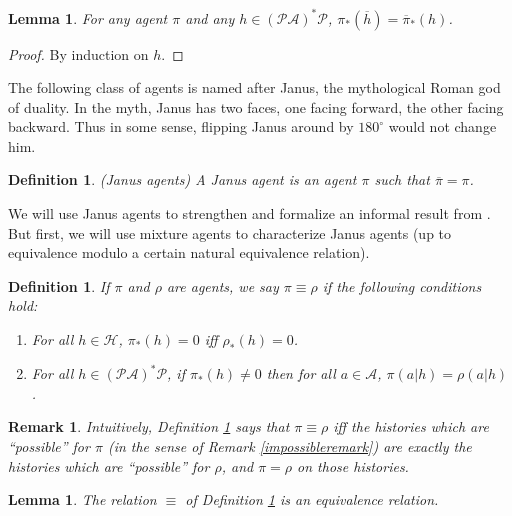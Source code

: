 \documentclass{article}
\newtheorem{definition}[theorem]{Definition}
\newtheorem{remark}[theorem]{Remark}
\newtheorem{lemma}[theorem]{Lemma}
\begin{document}
\begin{lemma}
\label{asteriskcommuteswithoverlinelemma}
    For any agent $\pi$ and any $h\in(\mathcal P\mathcal A)^*\mathcal P$,
    $\pi_*(\overline h)=\overline{\pi}_*(h)$.
\end{lemma}

\begin{proof}
    By induction on $h$.
\end{proof}

The following class of agents is named after Janus, the mythological
Roman god of duality. In the myth, Janus has two faces, one facing
forward, the other facing backward. Thus in some sense, flipping Janus
around by $180^\circ$ would not change him.

\begin{definition}
    (Janus agents)
    A \emph{Janus agent} is an agent $\pi$ such that
    $\overline{\pi}=\pi$.
\end{definition}

We will use Janus agents to strengthen and formalize an informal result
from \cite{alexander2021reward}.
But first, we will use mixture agents to characterize
Janus agents (up to equivalence modulo a certain natural equivalence relation).

\begin{definition}
\label{equivdefn}
    If $\pi$ and $\rho$ are agents, we say $\pi\equiv\rho$ if the
    following conditions hold:
    \begin{enumerate}
        \item For all $h\in\mathcal H$, $\pi_*(h)=0$ iff $\rho_*(h)=0$.
        \item For all $h\in(\mathcal P\mathcal A)^*\mathcal P$,
            if $\pi_*(h)\not=0$ then for all $a\in\mathcal A$,
            $\pi(a|h)=\rho(a|h)$.
    \end{enumerate}
\end{definition}

\begin{remark}
    Intuitively, Definition \ref{equivdefn} says that $\pi\equiv\rho$
    iff the histories which are ``possible'' for $\pi$ (in the sense of
    Remark \ref{impossibleremark}) are exactly the histories which are
    ``possible'' for $\rho$, and $\pi=\rho$ on those histories.
\end{remark}

\begin{lemma}
\label{equivrelationlemma}
    The relation $\equiv$ of Definition \ref{equivdefn} is an equivalence
    relation.
\end{lemma}
\end{document}
